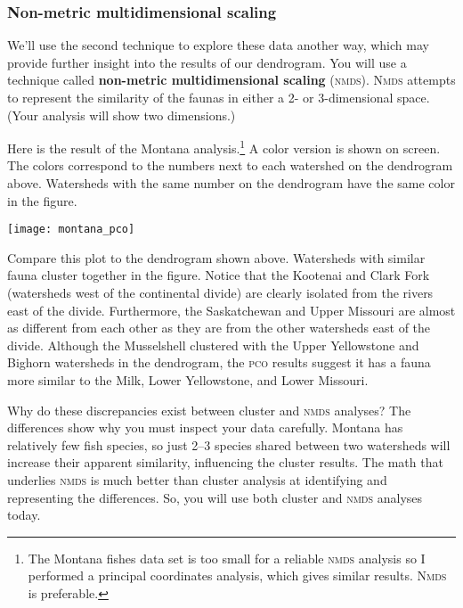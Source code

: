 \documentclass[11pt]{article}
\begin{document}
\subsubsection*{Non-metric multidimensional scaling}

We'll use the second technique to explore these data another way, which may provide 
further insight into the results of our dendrogram.  You will use a technique called 
\textbf{non-metric multidimensional scaling} (\textsc{nmds}). \textsc{Nmds} attempts to represent the similarity of the faunas in either a 2- or 3-dimensional space. (Your analysis will show two dimensions.)

Here is the result of the Montana analysis.\footnote{The Montana fishes data set
is too small for a reliable \textsc{nmds} analysis so I performed a principal
coordinates analysis, which gives similar results. \textsc{Nmds} is preferable.} A 
color version is shown on screen. The colors correspond to the numbers next to each
watershed on the dendrogram above. Watersheds with the same number on the dendrogram
have the same color in the figure.

\begin{center}
	\texttt{[image: montana\_pco]}
\end{center}

Compare this plot to the dendrogram shown above. Watersheds with similar fauna cluster
together in the figure. Notice that the Kootenai and Clark Fork (watersheds west of the 
continental divide) are clearly isolated from the rivers east of the divide. Furthermore, 
the Saskatchewan and Upper Missouri are almost as different from each other as they are 
from the other watersheds east of the divide. Although the Musselshell clustered with the 
Upper Yellowstone and Bighorn watersheds in the dendrogram, the \textsc{pco} results 
suggest it has a fauna more similar to the Milk, Lower Yellowstone, and Lower Missouri.

\newpage

Why do these discrepancies exist between cluster and \textsc{nmds} analyses? The
differences show why you must inspect your data carefully. Montana has relatively few fish
species, so just 2--3 species shared between two watersheds will increase their apparent similarity, 
influencing the cluster results. The math that underlies \textsc{nmds}
is much better than cluster analysis at identifying and representing the differences. So, you will use both cluster and \textsc{nmds} analyses
today.
\end{document}
